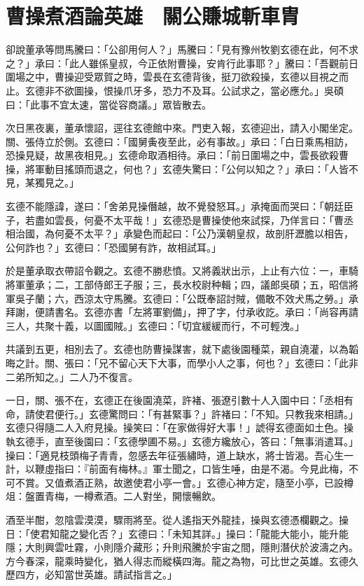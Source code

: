 
\chapter{曹操煮酒論英雄　關公賺城斬車胄}

卻說董承等問馬騰曰：「公卻用何人？」馬騰曰：「見有豫州牧劉玄德在此，何不求之？」承曰：「此人雖係皇叔，今正依附曹操，安肯行此事耶？」騰曰：「吾觀前日圍場之中，曹操迎受眾賀之時，雲長在玄德背後，挺刀欲殺操，玄德以目視之而止。玄德非不欲圖操，恨操爪牙多，恐力不及耳。公試求之，當必應允。」吳碩曰：「此事不宜太速，當從容商議。」眾皆散去。

次日黑夜裏，董承懷詔，逕往玄德館中來。門吏入報，玄德迎出，請入小閣坐定。關、張侍立於側。玄德曰：「國舅夤夜至此，必有事故。」承曰：「白日乘馬相訪，恐操見疑，故黑夜相見。」玄德命取酒相待。承曰：「前日圍場之中，雲長欲殺曹操，將軍動目搖頭而退之，何也？」玄德失驚曰：「公何以知之？」承曰：「人皆不見，某獨見之。」

玄德不能隱諱，遂曰：「舍弟見操僭越，故不覺發怒耳。」承掩面而哭曰：「朝廷臣子，若盡如雲長，何憂不太平哉！」玄德恐是曹操使他來試探，乃佯言曰：「曹丞相治國，為何憂不太平？」承變色而起曰：「公乃漢朝皇叔，故剖肝瀝膽以相告，公何詐也？」玄德曰：「恐國舅有詐，故相試耳。」

於是董承取衣帶詔令觀之。玄德不勝悲憤。又將義狀出示，上止有六位：一，車騎將軍董承；二，工部侍郎王子服；三，長水校尉种輯；四，議郎吳碩；五，昭信將軍吳子蘭；六，西涼太守馬騰。玄德曰：「公既奉詔討賊，備敢不效犬馬之勞。」承拜謝，便請書名。玄德亦書「左將軍劉備」，押了字，付承收訖。承曰：「尚容再請三人，共聚十義，以圖國賊。」玄德曰：「切宜緩緩而行，不可輕洩。」

共議到五更，相別去了。玄德也防曹操謀害，就下處後園種菜，親自澆灌，以為韜晦之計。關、張曰：「兄不留心天下大事，而學小人之事，何也？」玄德曰：「此非二弟所知之。」二人乃不復言。

一日，關、張不在，玄德正在後園澆菜，許褚、張遼引數十人入園中曰：「丞相有命，請使君便行。」玄德驚問曰：「有甚緊事？」許褚曰：「不知。只教我來相請。」玄德只得隨二人入府見操。操笑曰：「在家做得好大事！」諕得玄德面如土色。操執玄德手，直至後園曰：「玄德學圃不易。」玄德方纔放心，答曰：「無事消遣耳。」操曰：「適見枝頭梅子青青，忽感去年征張繡時，道上缺水，將士皆渴。吾心生一計，以鞭虛指曰：『前面有梅林。』軍士聞之，口皆生唾，由是不渴。今見此梅，不可不賞。又值煮酒正熟，故邀使君小亭一會。」玄德心神方定，隨至小亭，已設樽俎：盤置青梅，一樽煮酒。二人對坐，開懷暢飲。

酒至半酣，忽陰雲漠漠，驟雨將至。從人遙指天外龍挂，操與玄德憑欄觀之。操日：「使君知龍之變化否？」玄德曰：「未知其詳。」操曰：「龍能大能小，能升能隱；大則興雲吐霧，小則隱介藏形；升則飛騰於宇宙之間，隱則潛伏於波濤之內。方今春深，龍乘時變化，猶人得志而縱橫四海。龍之為物，可比世之英雄。玄德久歷四方，必知當世英雄。請試指言之。」

